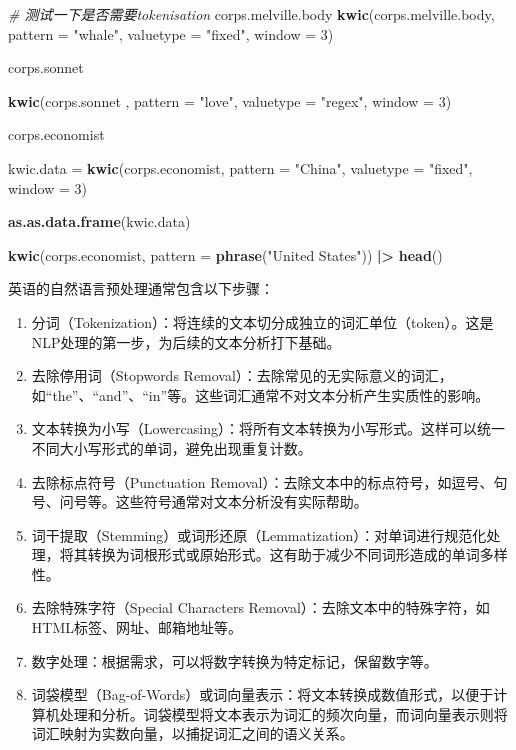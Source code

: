 \documentclass[]{book}
\newenvironment{Shaded}{\begin{snugshade}}{\end{snugshade}}
\newcommand{\CommentTok}[1]{\textcolor[rgb]{0.56,0.35,0.01}{\textit{#1}}}
\newcommand{\DataTypeTok}[1]{\textcolor[rgb]{0.13,0.29,0.53}{#1}}
\newcommand{\DecValTok}[1]{\textcolor[rgb]{0.00,0.00,0.81}{#1}}
\newcommand{\ErrorTok}[1]{\textcolor[rgb]{0.64,0.00,0.00}{\textbf{#1}}}
\newcommand{\KeywordTok}[1]{\textcolor[rgb]{0.13,0.29,0.53}{\textbf{#1}}}
\newcommand{\NormalTok}[1]{#1}
\newcommand{\OperatorTok}[1]{\textcolor[rgb]{0.81,0.36,0.00}{\textbf{#1}}}
\newcommand{\StringTok}[1]{\textcolor[rgb]{0.31,0.60,0.02}{#1}}
\begin{document}
\begin{Shaded}
\begin{Highlighting}[]
\CommentTok{# 测试一下是否需要tokenisation}
\NormalTok{corps.melville.body }
\KeywordTok{kwic}\NormalTok{(corps.melville.body, }\DataTypeTok{pattern =} \StringTok{"whale"}\NormalTok{, }\DataTypeTok{valuetype =} \StringTok{"fixed"}\NormalTok{, }\DataTypeTok{window =} \DecValTok{3}\NormalTok{)}

\NormalTok{corps.sonnet }

\KeywordTok{kwic}\NormalTok{(corps.sonnet , }\DataTypeTok{pattern =} \StringTok{"love"}\NormalTok{, }\DataTypeTok{valuetype =} \StringTok{"regex"}\NormalTok{, }\DataTypeTok{window =} \DecValTok{3}\NormalTok{)}


\NormalTok{corps.economist}

\NormalTok{kwic.data =}\StringTok{ }\KeywordTok{kwic}\NormalTok{(corps.economist, }\DataTypeTok{pattern =} \StringTok{"China"}\NormalTok{, }\DataTypeTok{valuetype =} \StringTok{"fixed"}\NormalTok{, }\DataTypeTok{window =} \DecValTok{3}\NormalTok{)}

\KeywordTok{as.as.data.frame}\NormalTok{(kwic.data)}

\KeywordTok{kwic}\NormalTok{(corps.economist, }\DataTypeTok{pattern =} \KeywordTok{phrase}\NormalTok{(}\StringTok{"United States"}\NormalTok{)) }\OperatorTok{|}\ErrorTok{>}
\StringTok{    }\KeywordTok{head}\NormalTok{()}
\end{Highlighting}
\end{Shaded}

英语的自然语言预处理通常包含以下步骤：

\begin{enumerate}
\def\labelenumi{\arabic{enumi}.}
\item
  分词（Tokenization）：将连续的文本切分成独立的词汇单位（token）。这是NLP处理的第一步，为后续的文本分析打下基础。
\item
  去除停用词（Stopwords Removal）：去除常见的无实际意义的词汇，如``the''、``and''、``in''等。这些词汇通常不对文本分析产生实质性的影响。
\item
  文本转换为小写（Lowercasing）：将所有文本转换为小写形式。这样可以统一不同大小写形式的单词，避免出现重复计数。
\item
  去除标点符号（Punctuation Removal）：去除文本中的标点符号，如逗号、句号、问号等。这些符号通常对文本分析没有实际帮助。
\item
  词干提取（Stemming）或词形还原（Lemmatization）：对单词进行规范化处理，将其转换为词根形式或原始形式。这有助于减少不同词形造成的单词多样性。
\item
  去除特殊字符（Special Characters Removal）：去除文本中的特殊字符，如HTML标签、网址、邮箱地址等。
\item
  数字处理：根据需求，可以将数字转换为特定标记，保留数字等。
\item
  词袋模型（Bag-of-Words）或词向量表示：将文本转换成数值形式，以便于计算机处理和分析。词袋模型将文本表示为词汇的频次向量，而词向量表示则将词汇映射为实数向量，以捕捉词汇之间的语义关系。
\end{enumerate}
\end{document}
